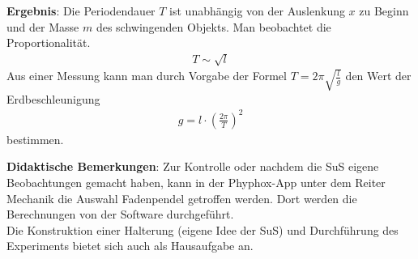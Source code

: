 \documentclass[../main.tex]{subfiles}
\begin{document}
\begin{tcolorbox}
    \vspace{0.5cm}
    \textbf{Ergebnis}: Die Periodendauer $T$ ist unabhängig von der Auslenkung $x$ zu Beginn und der Masse $m$ des schwingenden Objekts. Man beobachtet die Proportionalität.
    \begin{align*}
        T \sim \sqrt{l} 
    \end{align*}
    Aus einer Messung kann man durch Vorgabe der Formel $T=2 \pi \sqrt{\frac{l}{g}}$ den Wert der Erdbeschleunigung 
    \begin{align*}
        g = l \cdot \left(\frac{2\pi}{T}\right)^2
    \end{align*}
    bestimmen.


    \vspace{0.5cm}
    \textbf{Didaktische Bemerkungen}: Zur Kontrolle oder nachdem die SuS eigene Beobachtungen gemacht haben, kann in der Phyphox-App unter dem Reiter \glqq Mechanik \grqq{} die Auswahl \glqq Fadenpendel \grqq{} getroffen werden. Dort werden die Berechnungen von der Software durchgeführt.\\
    Die Konstruktion einer Halterung (eigene Idee der SuS) und Durchführung des Experiments bietet sich auch als Hausaufgabe an.

\end{tcolorbox}
\end{document}
